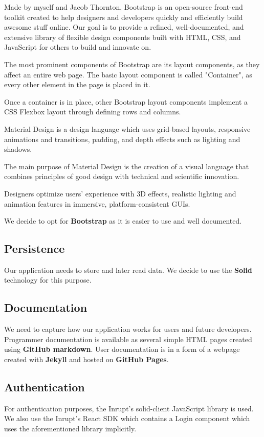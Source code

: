   Made by myself and Jacob Thornton, Bootstrap is an open-source front-end toolkit created to help designers and developers quickly and efficiently build awesome stuff online. Our goal is to provide a refined, well-documented, and extensive library of flexible design components built with HTML, CSS, and JavaScript for others to build and innovate on.

  The most prominent components of Bootstrap are its layout components, as they affect an entire web page. The basic layout component is called "Container", as every other element in the page is placed in it.

  Once a container is in place, other Bootstrap layout components implement a CSS Flexbox layout through defining rows and columns.

  Material Design is a design language which uses grid-based layouts, responsive animations and transitions, padding, and depth effects such as lighting and shadows.

  The main purpose of Material Design is the creation of a visual language that combines principles of good design with technical and scientific innovation. 

  Designers optimize users' experience with 3D effects, realistic lighting and animation features in immersive, platform-consistent GUIs.

  We decide to opt for \textbf{Bootstrap} as it is easier to use and well documented.

\subsection*{Persistence}
Our application needs to store and later read data.
We decide to use the \textbf{Solid} technology for this purpose. 

\subsection*{Documentation}
We need to capture how our application works for users and future developers.
Programmer documentation is available as several simple HTML pages created using \textbf{GitHub markdown}.
User documentation is in a form of a webpage created with \textbf{Jekyll} and hosted on \textbf{GitHub Pages}.

\subsection*{Authentication}
For authentication purposes, the Inrupt's solid-client JavaScript library is used.
We also use the Inrupt's React SDK which contains a Login component which uses the aforementioned library implicitly.

